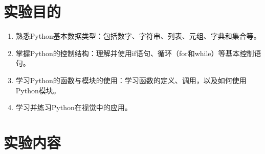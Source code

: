 \documentclass[12pt,a4paper,UTF8]{article}
\begin{document}
    \tableofcontents
    \newpage

    \NoBgThispage
    \section{实验目的}
    \begin{enumerate}    
        \item 熟悉Python基本数据类型：包括数字、字符串、列表、元组、字典和集合等。
        \item 掌握Python的控制结构：理解并使用if语句、循环（for和while）等基本控制语句。
        \item 学习Python的函数与模块的使用：学习函数的定义、调用，以及如何使用Python模块。
        \item 学习并练习Python在视觉中的应用。
    \end{enumerate}
    
    \section{实验内容}
\end{document}
